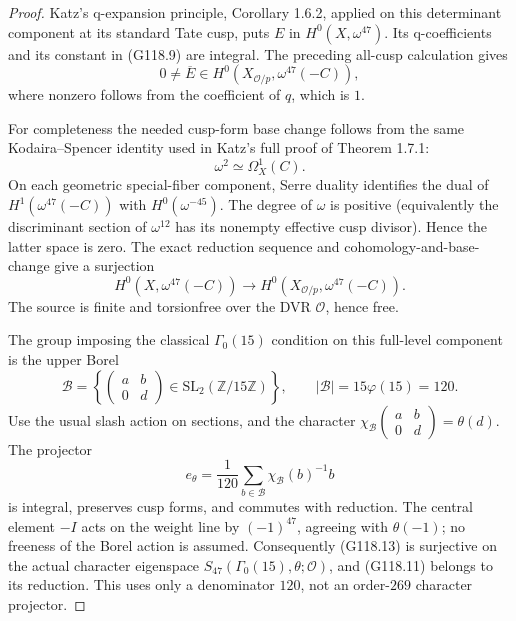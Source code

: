 \begin{proof}
Katz's q-expansion principle, Corollary 1.6.2, applied on this determinant
component at its standard Tate cusp, puts $E$ in
$H^0(X,\omega^{47})$.  Its q-coefficients and its constant in (G118.9) are
integral.  The preceding all-cusp calculation gives
\[
       0\ne\overline E\in
       H^0(X_{\mathcal O/p},\omega^{47}(-C)),
                                                        \tag{G118.11}
\]
where nonzero follows from the coefficient of $q$, which is $1$.

For completeness the needed cusp-form base change follows from the same
Kodaira--Spencer identity used in Katz's full proof of Theorem 1.7.1:
\[
                 \omega^2\simeq\Omega^1_X(C).
                                                        \tag{G118.12}
\]
On each geometric special-fiber component, Serre duality identifies the
dual of $H^1(\omega^{47}(-C))$ with $H^0(\omega^{-45})$.
The degree of $\omega$ is positive (equivalently the discriminant section
of $\omega^{12}$ has its nonempty effective cusp divisor).
Hence the latter space is zero.  The exact reduction sequence and
cohomology-and-base-change give a surjection
\[
 H^0(X,\omega^{47}(-C))\longrightarrow
 H^0(X_{\mathcal O/p},\omega^{47}(-C)).
                                                        \tag{G118.13}
\]
The source is finite and torsionfree over the DVR $\mathcal O$, hence free.

The group imposing the classical $\Gamma_0(15)$ condition on this full-level
component is the upper Borel
\[
 \mathcal B=\left\{\begin{pmatrix}a&b\\0&d\end{pmatrix}
       \in\mathrm{SL}_2(\mathbb Z/15\mathbb Z)\right\},
       \qquad |\mathcal B|=15\varphi(15)=120.
                                                        \tag{G118.14}
\]
Use the usual slash action on sections, and the character
$\chi_{\mathcal B}(\begin{smallmatrix}a&b\\0&d\end{smallmatrix})=\theta(d)$.
The projector
\[
 e_\theta=\frac1{120}\sum_{b\in\mathcal B}\chi_{\mathcal B}(b)^{-1}b
                                                        \tag{G118.15}
\]
is integral, preserves cusp forms, and commutes with reduction.
The central element $-I$ acts on the weight line by $(-1)^{47}$, agreeing
with $\theta(-1)$; no freeness of the Borel action is assumed.
Consequently (G118.13) is surjective on the actual character eigenspace
$S_{47}(\Gamma_0(15),\theta;\mathcal O)$, and (G118.11) belongs to its
reduction.  This uses only a denominator $120$, not an order-$269$
character projector.


\end{proof}

